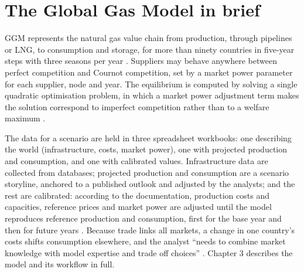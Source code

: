\section{The Global Gas Model in brief}

GGM represents the natural gas value chain from production, through pipelines or LNG, to consumption and storage, for more than ninety countries in five-year steps with three seasons per year \citep{egging2019global}.
Suppliers may behave anywhere between perfect competition and Cournot competition, set by a market power parameter for each supplier, node and year.
The equilibrium is computed by solving a single quadratic optimisation problem, in which a market power adjustment term makes the solution correspond to imperfect competition rather than to a welfare maximum \citep[pp.~47, 49]{egging2019global}.

The data for a scenario are held in three spreadsheet workbooks: one describing the world (infrastructure, costs, market power), one with projected production and consumption, and one with calibrated values.
Infrastructure data are collected from databases; projected production and consumption are a scenario storyline, anchored to a published outlook and adjusted by the analysts; and the rest are calibrated: according to the documentation, production costs and capacities, reference prices and market power are adjusted until the model reproduces reference production and consumption, first for the base year and then for future years \citep[p.~26]{egging2019global}.
Because trade links all markets, a change in one country's costs shifts consumption elsewhere, and the analyst ``needs to combine market knowledge with model expertise and trade off choices'' \citep[p.~26]{egging2019global}.
Chapter 3 describes the model and its workflow in full.
